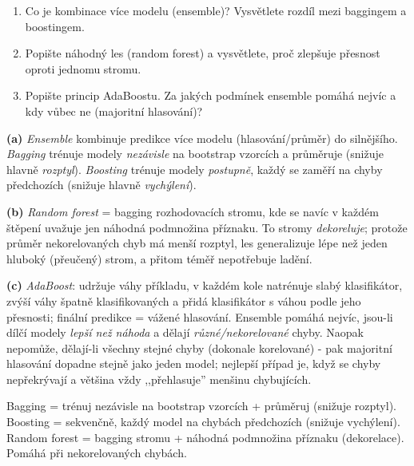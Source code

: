 \begin{zadani}
\begin{enumerate}[label=(\alph*)]
  \item {} Co je kombinace více modelu (ensemble)? Vysvětlete rozdíl mezi baggingem a boostingem.
  \item {} Popište náhodný les (random forest) a vysvětlete, proč zlepšuje přesnost oproti jednomu stromu.
  \item {} Popište princip AdaBoostu. Za jakých podmínek ensemble pomáhá nejvíc a kdy vůbec ne (majoritní hlasování)?
\end{enumerate}
\end{zadani}

\begin{reseni}
\textbf{(a)} \emph{Ensemble} kombinuje predikce více modelu (hlasování/průměr) do silnějšího. \emph{Bagging} trénuje modely \emph{nezávisle} na bootstrap vzorcích a průměruje (snižuje hlavně \emph{rozptyl}). \emph{Boosting} trénuje modely \emph{postupně}, každý se zaměří na chyby předchozích (snižuje hlavně \emph{vychýlení}).

\textbf{(b)} \emph{Random forest} = bagging rozhodovacích stromu, kde se navíc v každém štěpení uvažuje jen náhodná podmnožina příznaku. To stromy \emph{dekoreluje}; protože průměr nekorelovaných chyb má menší rozptyl, les generalizuje lépe než jeden hluboký (přeučený) strom, a přitom téměř nepotřebuje ladění.

\textbf{(c)} \emph{AdaBoost}: udržuje váhy příkladu, v každém kole natrénuje slabý klasifikátor, zvýší váhy špatně klasifikovaných a přidá klasifikátor s váhou podle jeho přesnosti; finální predikce = vážené hlasování. Ensemble pomáhá nejvíc, jsou-li dílčí modely \emph{lepší než náhoda} a dělají \emph{různé/nekorelované} chyby. Naopak nepomůže, dělají-li všechny stejné chyby (dokonale korelované) - pak majoritní hlasování dopadne stejně jako jeden model; nejlepší případ je, když se chyby nepřekrývají a většina vždy ,,přehlasuje'' menšinu chybujících.
\end{reseni}

\begin{jadro}
Bagging = trénuj nezávisle na bootstrap vzorcích + průměruj (snižuje rozptyl). Boosting = sekvenčně, každý model na chybách předchozích (snižuje vychýlení). Random forest = bagging stromu + náhodná podmnožina příznaku (dekorelace). Pomáhá při nekorelovaných chybách.
\end{jadro}

